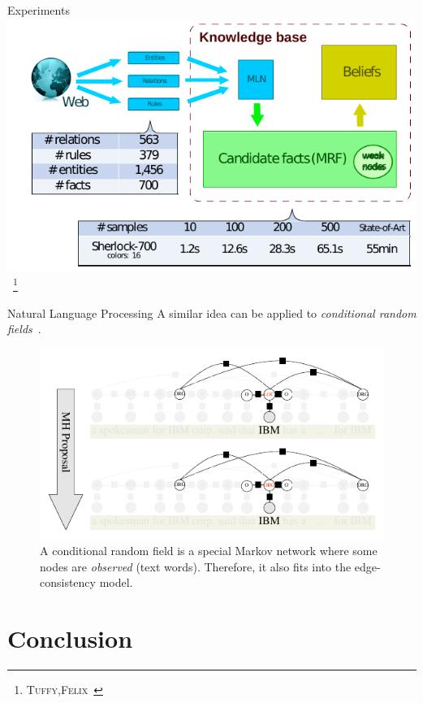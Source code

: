 \documentclass[onlymath,xcolor=pdftex,dvipsnames,table]{beamer}
\newcommand{\tuffy}{\textsc{Tuffy}\xspace}
\newcommand{\felix}{\textsc{Felix}\xspace}
\let\oldemph\emph
\renewcommand{\emph}[1]{{\color{Blue}\oldemph{#1}}}
\theoremstyle{remark} %
\begin{document}
\begin{frame}{Experiments}
\centering
\includegraphics[width=\textwidth]{results.pdf}~\footnote{\tuffy,\felix~\cite{niu2011tuffy,niu2011felix}}
\end{frame}

\begin{frame}{Natural Language Processing}
A similar idea can be applied to \emph{conditional random fields}~\cite{sutton2006introduction}.
\begin{figure}
  \centering
  \includegraphics[width=.8\textwidth]{crf.pdf}
  \caption{A conditional random field is a special Markov network where some nodes are \emph{observed} (text words). Therefore, it also fits into the edge-consistency model.}
\end{figure}
\end{frame}


\section{Conclusion}
\end{document}
